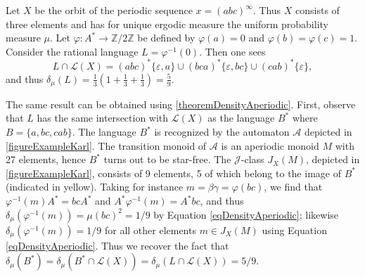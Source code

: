\documentclass[a4paper,UKenglish,numberwithinsect,cleveref]{lipics-v2021}
\newcommand{\JJ}{\mathrel{\mathscr{J}}}
\newcommand{\A}{\mathcal A}
\newcommand{\Z}{\mathbb{Z}}
\newcommand{\cL}{\mathcal L}
\begin{document}
\begin{example}\label{exampleKarl}
    Let $X$ be the orbit of the periodic sequence $x=(abc)^\infty$. Thus $X$ consists of three elements and has for unique ergodic measure the uniform probability measure $\mu$. Let $\varphi\colon A^*\to\Z/2\Z$ be defined by $\varphi(a)=0$ and $\varphi(b)=\varphi(c)=1$. Consider the rational language $L=\varphi^{-1}(0)$. Then one sees
    \begin{displaymath}
        L\cap\cL(X)=(abc)^*\{\varepsilon,a\}\cup(bca)^*\{\varepsilon,bc\}\cup (cab)^*\{\varepsilon\},
    \end{displaymath}
    and thus $\delta_\mu(L)=\frac{1}{3}\left(1+\frac{1}{3}+\frac{1}{3}\right)=\frac{5}{9}$.

    The same result can be obtained using \cref{theoremDensityAperiodic}. First, observe that $L$ has the same intersection with $\cL(X)$ as the language $B^*$ where $B=\{a,bc,cab\}$. The language $B^*$ is recognized by the automaton $\A$ depicted in \cref{figureExampleKarl}. The transition monoid of $\A$ is an aperiodic monoid $M$ with 27 elements, hence  $B^* $ turns out to be  star-free. The $\JJ$-class $J_X(M)$, depicted in \cref{figureExampleKarl}, consists of 9 elements, 5 of which belong to the image of $B^*$ (indicated in yellow). Taking for instance $m = \beta\gamma=\varphi(bc)$, we find that $\varphi^{-1}(m)A^* = bcA^*$ and $A^*\varphi^{-1}(m) = A^*bc$, and thus $\delta_\mu(\varphi^{-1}(m))=\mu(bc)^2=1/9$ by Equation \eqref{eqDensityAperiodic}; likewise $\delta_\mu(\varphi^{-1}(m))=1/9$ for all other elements $m\in J_X(M)$ using Equation \eqref{eqDensityAperiodic}. Thus we recover the fact that $\delta_\mu(B^*)=\delta_{\mu}(B^* \cap \cL(X))=\delta_{\mu}(L \cap \cL(X))=5/9$.

    \begin{figure}
      \centering
\end{figure}
\end{example}
\end{document}
